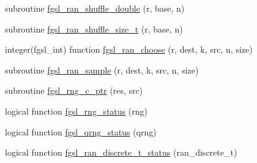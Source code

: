 \begin{DoxyCompactItemize}
\item 
subroutine \hyperlink{rng_8finc_a33391af19497bfdf9870f129fc114070}{fgsl\-\_\-ran\-\_\-shuffle\-\_\-double} (r, base, n)
\item 
subroutine \hyperlink{rng_8finc_a7d2b8339b78f1d615ebb5f22c308cc21}{fgsl\-\_\-ran\-\_\-shuffle\-\_\-size\-\_\-t} (r, base, n)
\item 
integer(fgsl\-\_\-int) function \hyperlink{rng_8finc_a7a83bdd81ff77823a45f43c9de5a7475}{fgsl\-\_\-ran\-\_\-choose} (r, dest, k, src, n, size)
\item 
subroutine \hyperlink{rng_8finc_af3c71cb897158ffa0aca18cadd745030}{fgsl\-\_\-ran\-\_\-sample} (r, dest, k, src, n, size)
\item 
subroutine \hyperlink{rng_8finc_abe2110f8c489c3b628ea01abd54d973a}{fgsl\-\_\-rng\-\_\-c\-\_\-ptr} (res, src)
\item 
logical function \hyperlink{rng_8finc_ad8000eda2b5a0915e885495569d98538}{fgsl\-\_\-rng\-\_\-status} (rng)
\item 
logical function \hyperlink{rng_8finc_afcce5a85c69e796301406c0c2f8891eb}{fgsl\-\_\-qrng\-\_\-status} (qrng)
\item 
logical function \hyperlink{rng_8finc_a72a06cb2c031418f6139b91ed3af6389}{fgsl\-\_\-ran\-\_\-discrete\-\_\-t\-\_\-status} (ran\-\_\-discrete\-\_\-t)
\end{DoxyCompactItemize}



